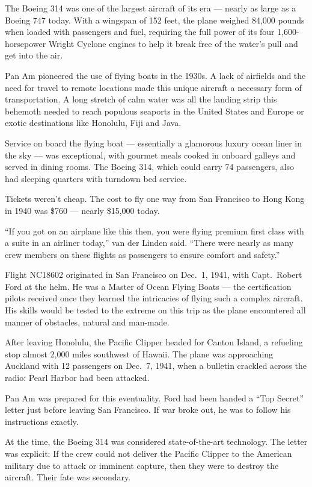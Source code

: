 \documentclass[12pt]{article}
\begin{document}
The Boeing 314 was one of the largest aircraft of its era --- nearly as large as a Boeing 747 today. With a wingspan of 152 feet, the plane weighed 84,000 pounds when loaded with passengers and fuel, requiring the full power of its four 1,600-horsepower Wright Cyclone engines to help it break free of the water’s pull and get into the air.

Pan Am pioneered the use of flying boats in the 1930s. A lack of airfields and the need for travel to remote locations made this unique aircraft a necessary form of transportation. A long stretch of calm water was all the landing strip this behemoth needed to reach populous seaports in the United States and Europe or exotic destinations like Honolulu, Fiji and Java.

Service on board the flying boat --- essentially a glamorous luxury ocean liner in the sky --- was exceptional, with gourmet meals cooked in onboard galleys and served in dining rooms. The Boeing 314, which could carry 74 passengers, also had sleeping quarters with turndown bed service.

Tickets weren’t cheap. The cost to fly one way from San Francisco to Hong Kong in 1940 was \$760 --- nearly \$15,000 today.

``If you got on an airplane like this then, you were flying premium first class with a suite in an airliner today,'' van der Linden said. ``There were nearly as many crew members on these flights as passengers to ensure comfort and safety.''

Flight NC18602 originated in San Francisco on Dec.~1, 1941, with Capt.~Robert Ford at the helm. He was a Master of Ocean Flying Boats --- the certification pilots received once they learned the intricacies of flying such a complex aircraft. His skills would be tested to the extreme on this trip as the plane encountered all manner of obstacles, natural and man-made.

After leaving Honolulu, the Pacific Clipper headed for Canton Island, a refueling stop almost 2,000 miles southwest of Hawaii. The plane was approaching Auckland with 12 passengers on Dec.~7, 1941, when a bulletin crackled across the radio: Pearl Harbor had been attacked.

Pan Am was prepared for this eventuality. Ford had been handed a ``Top Secret'' letter just before leaving San Francisco. If war broke out, he was to follow his instructions exactly.

At the time, the Boeing 314 was considered state-of-the-art technology. The letter was explicit: If the crew could not deliver the Pacific Clipper to the American military due to attack or imminent capture, then they were to destroy the aircraft. Their fate was secondary.
\end{document}
